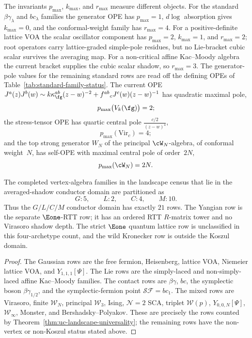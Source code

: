 \begin{remark}
The invariants $p_{\max}$, $k_{\max}$, and $r_{\max}$ measure different
objects. For the standard $\beta\gamma_\lambda$ and $bc_\lambda$
families the generator OPE has $p_{\max}=1$, $d\log$ absorption gives
$k_{\max}=0$, and the conformal-weight family has $r_{\max}=4$. For a
positive-definite lattice VOA the scalar oscillator component has
$p_{\max}=2$, $k_{\max}=1$, and $r_{\max}=2$; root operators carry
lattice-graded simple-pole residues, but no Lie-bracket cubic scalar
survives the averaging map. For a non-critical affine Kac--Moody
algebra the current bracket supplies the cubic scalar shadow, so
$r_{\max}=3$.
The generator-pole values for the remaining standard rows are read
off the defining OPEs of Table~\ref{tab:standard-family-status}.
The current OPE
$J^a(z)J^b(w)\sim k\kappa_\fg^{ab}(z-w)^{-2}
+f^{ab}{}_cJ^c(w)(z-w)^{-1}$ has quadratic maximal pole,
\begin{equation}\label{eq:affine-KM-p-max}
p_{\max}\bigl(V_k(\fg)\bigr) = 2;
\end{equation}
the stress-tensor OPE has quartic central pole
$\tfrac{c/2}{(z-w)^4}$,
\begin{equation}\label{eq:vir-p-max}
p_{\max}(\mathrm{Vir}_c) = 4;
\end{equation}
and the top strong generator $W_N$ of the principal $\cW_N$-algebra,
of conformal weight~$N$, has self-OPE with maximal central pole of
order~$2N$,
\begin{equation}\label{eq:w-N-p-max}
p_{\max}(\cW_N) = 2N.
\end{equation}
\end{remark}

\begin{proposition}
\label{prop:census-conductor-row-count}
\ClaimStatusProvedHere
The completed vertex-algebra families in the landscape census that
lie in the averaged-shadow conductor domain are partitioned as
\[
G:5,\qquad L:2,\qquad C:4,\qquad M:10.
\]
Thus the $G/L/C/M$ conductor domain has exactly $21$ rows. The Yangian
row is the separate $\Eone$-RTT row; it has an ordered RTT
$R$-matrix tower and no Virasoro shadow depth. The strict $\Eone$
quantum lattice row is unclassified in this four-archetype count, and
the wild Kronecker row is outside the Koszul domain.
\end{proposition}

\begin{proof}
The Gaussian rows are the free fermion, Heisenberg, lattice VOA,
Niemeier lattice VOA, and $Y_{1,1,1}[\Psi]$. The Lie rows are the
simply-laced and non-simply-laced affine Kac--Moody families. The
contact rows are $\beta\gamma$, $bc$, the symplectic boson
$\beta\gamma_{1/2}$, and the symplectic-fermion point
$\mathcal{SF}=bc_1$. The mixed rows are Virasoro, finite
$\mathcal W_N$, principal $\mathcal W_3$, Ising, $\mathcal N{=}2$
SCA, triplet $\mathcal W(p)$, $Y_{0,0,N}[\Psi]$,
$\mathcal W_\infty$, Monster, and Bershadsky--Polyakov. These are
precisely the rows counted by
Theorem~\ref{thm:uc-landscape-universality}; the remaining rows have
the non-vertex or non-Koszul status stated above.
\end{proof}

